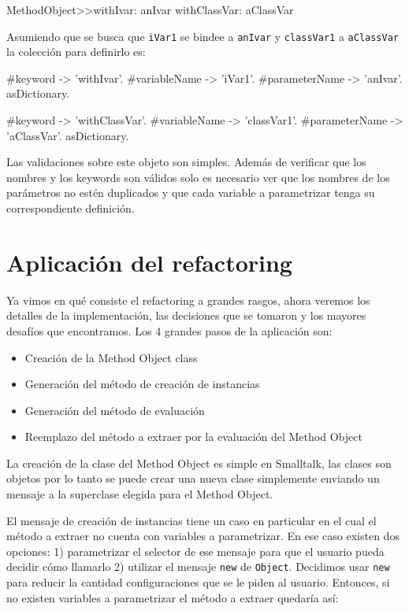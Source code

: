 \begin{code}
MethodObject>>withIvar: anIvar withClassVar: aClassVar
\end{code}

Asumiendo que se busca que \lstinline{iVar1} se bindee a \lstinline{anIvar} y
\lstinline{classVar1} a \lstinline{aClassVar} la colección para definirlo es:

\begin{code}
    { { #keyword -> 'withIvar'.  #variableName -> 'iVar1'.  #parameterName ->
        'anIvar'.  } asDictionary.

        { #keyword -> 'withClassVar'.  #variableName -> 'classVar1'.
          #parameterName -> 'aClassVar'.  } asDictionary.  }
\end{code}

Las validaciones sobre este objeto son simples. Además de verificar que los
nombres y los keywords son válidos solo es necesario ver que los nombres de los
parámetros no estén duplicados y que cada variable a parametrizar tenga su
correspondiente definición.


\section{Aplicación del refactoring}

Ya vimos en qué consiste el refactoring a grandes rasgos, ahora veremos los
detalles de la implementación, las decisiones que se tomaron y los mayores
desafíos que encontramos. Los 4 grandes pasos de la aplicación son:

\begin{itemize}
    \item Creación de la Method Object class
    \item Generación del método de creación de instancias
    \item Generación del método de evaluación
    \item Reemplazo del método a extraer por la evaluación del Method Object
\end{itemize}

La creación de la clase del Method Object es simple en Smalltalk, las clases son
objetos por lo tanto se puede crear una nueva clase simplemente enviando un
mensaje a la superclase elegida para el Method Object.

El mensaje de creación de instancias tiene un caso en particular en el cual el
método a extraer no cuenta con variables a parametrizar. En ese caso existen dos
opciones: 1) parametrizar el selector de ese mensaje para que el usuario pueda
decidir cómo llamarlo 2) utilizar el mensaje \lstinline{new} de
\lstinline{Object}. Decidimos usar \lstinline{new} para reducir la cantidad
configuraciones que se le piden al usuario. Entonces, si no existen variables a
parametrizar el método a extraer quedaría así:


